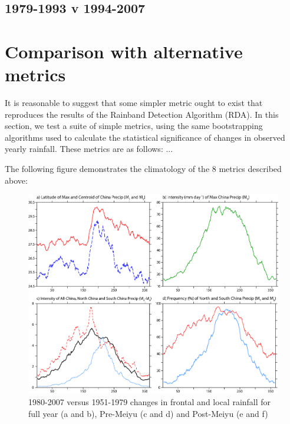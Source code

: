 \subsection{1979-1993 v 1994-2007}

\section{Comparison with alternative metrics}
It is reasonable to suggest that some simpler metric ought to exist that reproduces the results of the Rainband Detection Algorithm (RDA). In this section, we test a suite of simple metrics, using the same bootstrapping algorithms used to calculate the statistical significance of changes in observed yearly rainfall. These metrics are as follows: ...

The following figure demonstrates the climatology of the 8 metrics described above:

\begin{figure}[htb]

\noindent\includegraphics[width=36pc]{Figures/A3_met_climo}
\caption{1980-2007 versus 1951-1979 changes in frontal and local rainfall for full year (a and b), Pre-Meiyu (c and d) and Post-Meiyu (e and f)}
\end{figure}




